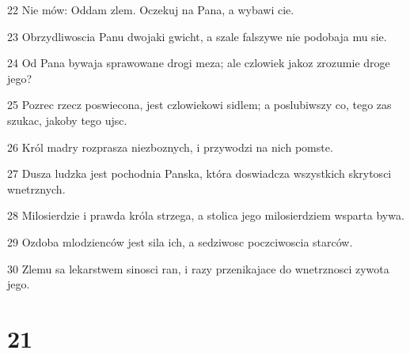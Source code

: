\par 22 Nie mów: Oddam zlem. Oczekuj na Pana, a wybawi cie.
\par 23 Obrzydliwoscia Panu dwojaki gwicht, a szale falszywe nie podobaja mu sie.
\par 24 Od Pana bywaja sprawowane drogi meza; ale czlowiek jakoz zrozumie droge jego?
\par 25 Pozrec rzecz poswiecona, jest czlowiekowi sidlem; a poslubiwszy co, tego zas szukac, jakoby tego ujsc.
\par 26 Król madry rozprasza niezboznych, i przywodzi na nich pomste.
\par 27 Dusza ludzka jest pochodnia Panska, która doswiadcza wszystkich skrytosci wnetrznych.
\par 28 Milosierdzie i prawda króla strzega, a stolica jego milosierdziem wsparta bywa.
\par 29 Ozdoba mlodzienców jest sila ich, a sedziwosc poczciwoscia starców.
\par 30 Zlemu sa lekarstwem sinosci ran, i razy przenikajace do wnetrznosci zywota jego.

\chapter{21}


